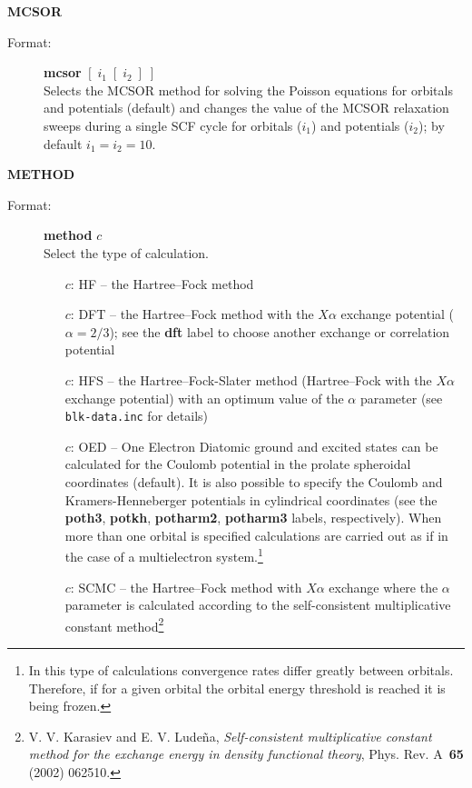\documentclass[12pt,a4paper]{article}
\newcommand{\ft}[1]{\texttt{#1}}
\newcommand{\fb}[1]{\textbf{#1}}
\begin{document}
\begin{description}
\begin{description}
\begin{description}
\end{description}
\end{description}


\item \textbf{MCSOR}
\begin{description}
\item[Format:] \textbf{mcsor} $[\;i_1\;[\;i_2\;]\;]$\\
Selects the MCSOR method for solving the Poisson equations for orbitals and potentials
(default) and changes the value of the MCSOR relaxation sweeps during a single SCF
cycle for orbitals ($i_1$) and potentials ($i_2$); by default $i_1=i_2=10$.

\end{description}
\item \textbf{METHOD}
\begin{description}
\item[Format:] \textbf{method} $c$\\
Select the type of calculation.
\begin{itemize}
\item[$c$:] HF -- the Hartree--Fock method
\item[$c$:] DFT -- the Hartree--Fock method with the $X\alpha$ exchange
  potential ($\alpha=2/3$); see the \fb{dft} label to choose
  another exchange or correlation potential

\item[$c$:] HFS -- the Hartree--Fock-Slater method (Hartree--Fock with the
  $X\alpha$ exchange potential) with an optimum value of the $\alpha$
  parameter (see \ft{blk-\-data.\-inc} for details)

\item[$c$:] OED -- One Electron Diatomic ground and excited states
  can be calculated for the Coulomb potential in the prolate
  spheroidal coordinates (default). It is also possible to specify
the Coulomb and Kramers-Henneberger potentials in cylindrical
coordinates (see the \fb{poth3}, \fb{potkh}, \fb{potharm2}, \fb{potharm3}  labels,
respectively). When more than one orbital is specified calculations
are carried out as if in the case of a multielectron
system.\footnote{In this type of calculations convergence rates differ
  greatly between orbitals. Therefore, if for a given orbital the
  orbital energy threshold is reached it is being frozen.}

\item[$c$:] SCMC -- the Hartree--Fock method with $X\alpha$ exchange
  where the $\alpha$ parameter is calculated according to the
  self-consistent multiplicative constant
  method\footnote{V. V. Karasiev and E. V. Lude\~{n}a,
    \textsl{Self-consistent multiplicative constant method for the
      exchange energy in density functional theory},
    Phys. Rev. A~\textbf{65} (2002)
    062510. }


\end{itemize}
\end{description}
\end{description}
\end{document}
